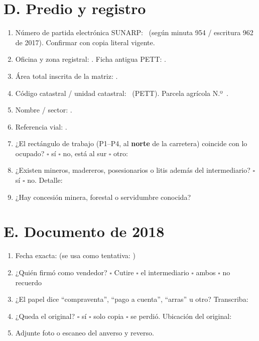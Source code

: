 \documentclass[12pt,a4paper]{article}
\begin{document}
\section*{D. Predio y registro}
\begin{enumerate}[leftmargin=1.15cm]
\item Número de partida electrónica SUNARP: \textbf{\PartidaMatriz}\ (según minuta 954 / escritura 962 de 2017). Confirmar con copia literal vigente.
\item Oficina y zona registral: \textbf{\OficinaRegistral}. Ficha antigua PETT: \FichaRegistralAntigua.
\item Área total inscrita de la matriz: \textbf{\AreaMatriz}.
\item Código catastral / unidad catastral: \textbf{\UnidadCatastral}\ (PETT). Parcela agrícola N.º\ \ParcelaAgricola.
\item Nombre / sector: \textbf{\NombreFundo}.
\item Referencia vial: \textbf{\KmCarretera}.
\item ¿El rectángulo de trabajo (P1--P4, al \textbf{norte} de la carretera) coincide con lo ocupado? \quad $\square$ sí \quad $\square$ no, está al sur \quad $\square$ otro: \linea[3.2cm]
\item ¿Existen mineros, madereros, posesionarios o litis además del intermediario? \quad $\square$ sí \quad $\square$ no. Detalle: \linea[5.5cm]
\item ¿Hay concesión minera, forestal o servidumbre conocida? \linea[8.2cm]
\end{enumerate}

\section*{E. Documento de 2018}
\begin{enumerate}[leftmargin=1.15cm]
\item Fecha exacta: \linea[4cm] (se usa como tentativa: \FechaPago)
\item ¿Quién firmó como vendedor? \quad $\square$ Cutire \quad $\square$ el intermediario \quad $\square$ ambos \quad $\square$ no recuerdo
\item ¿El papel dice ``compraventa'', ``pago a cuenta'', ``arras'' u otro? Transcriba: \linea[5.8cm]
\item ¿Queda el original? \quad $\square$ sí \quad $\square$ solo copia \quad $\square$ se perdió. Ubicación del original: \linea[4.4cm]
\item Adjunte foto o escaneo del anverso y reverso.
\end{enumerate}
\end{document}
